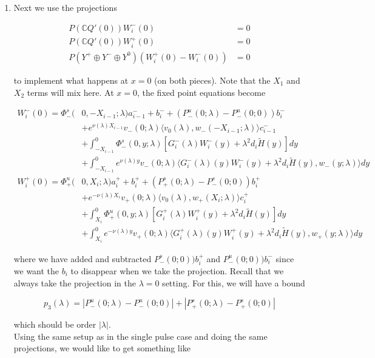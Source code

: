 \documentclass[12pt]{article}
\def\C{{\mathbb C}}
\begin{document}
\begin{enumerate}
\item Next we use the projections 

\begin{align*}
P(\C Q'(0))W_i^-(0) &= 0 \\
P(\C Q'(0))W_i^+(0) &= 0 \\
P(Y^+ \oplus Y^- \oplus Y^0) ( W_i^+(0) - W_i^-(0) ) &= 0
\end{align*}

to implement what happens at $x = 0$ (on both pieces). Note that the $X_1$ and $X_2$ terms will mix here. At $x = 0$, the fixed point equations become

\begin{align*}
W_i^-(0) = \Phi^s_-(&0, -X_{i-1}; \lambda)a_{i-1}^- + b_i^- + (P^u_-(0; \lambda) - P^u_-(0; 0))b_i^- \\
&+ e^{\nu(\lambda)X_{i-1}} v_-(0; \lambda) \langle v_0(\lambda), w_-(-X_{i-1}; \lambda) \rangle c_{i-1}^- \\
&+ \int_{-X_{i-1}}^0 \Phi^s_-(0, y; \lambda) [ G_i^-(\lambda)W_i^-(y) + \lambda^2 d_i \tilde{H}(y) ] dy \\
&+ \int_{-X_{i-1}}^0
e^{\nu(\lambda)y} v_-(0; \lambda) \langle G_i^-(\lambda)(y)W_i^-(y) + \lambda^2 d_i \tilde{H}(y), w_-(y; \lambda) \rangle dy \\
W_i^+(0) = \Phi^u_+(&0, X_i; \lambda)a_i^+ + b_i^+ + (P^s_+(0; \lambda) - P^s_-(0; 0))b_i^+ \\
&+ e^{-\nu(\lambda) X_i} v_+(0; \lambda) \langle v_0(\lambda), w_+(X_i; \lambda) \rangle c_i^+ \\
&+ \int_{X_i}^0 \Phi^u_+(0, y; \lambda) [ G_i^+(\lambda)W_i^+(y) + \lambda^2 d_i \tilde{H}(y) ] dy \\
&+ \int_{X_i}^0 e^{-\nu(\lambda)y} v_+(0; \lambda) \langle G_i^+(\lambda)(y)W_i^+(y) + \lambda^2 d_i \tilde{H}(y), w_+(y; \lambda) \rangle dy
\end{align*}

where we have added and subtracted $P^s_-(0; 0))b_i^+$ and $P^u_-(0; 0))b_i^-$ since we want the $b_i$ to disappear when we take the projection. Recall that we always take the projection in the $\lambda = 0$ setting. For this, we will have a bound

\[
p_3(\lambda) = |P^u_-(0;\lambda) - P^u_-(0; 0)| + |P^s_+(0;\lambda) - P^s_+(0;0)|
\]

which should be order $|\lambda|$.\\

Using the same setup as in the single pulse case and doing the same projections, we would like to get something like


\end{enumerate}
\end{document}
